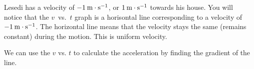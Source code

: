         
        \label{m38795*id70472}Lesedi has a velocity of \begin{math}-1\phantom{\rule{2pt}{0ex}}\mathrm{m}\ensuremath{\cdot}\mathrm{s}{}^{-1}\end{math}, or \begin{math}1\phantom{\rule{2pt}{0ex}}\mathrm{m}\ensuremath{\cdot}\mathrm{s}{}^{-1}\end{math} towards his house. You will notice that the \begin{math}v\end{math}~vs.~\begin{math}t\end{math} graph is a horisontal line corresponding to a velocity of \begin{math}-1\phantom{\rule{2pt}{0ex}}\mathrm{m}\ensuremath{\cdot}\mathrm{s}{}^{-1}\end{math}. The horizontal line means that the velocity stays the same (remains constant) during the motion. This is uniform velocity.\par 
        \label{m38795*id70573}We can use the \begin{math}v\end{math} vs. \begin{math}t\end{math} to calculate the acceleration by finding the gradient of the line.\par 
        \label{m38795*id70595}\nopagebreak\noindent{}
